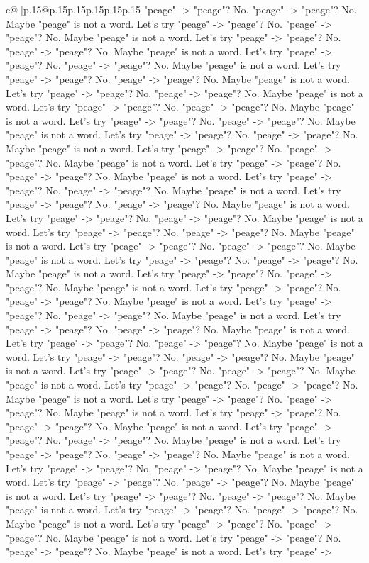 \documentclass{article}
\begin{document}
{\begin{supertabular}{c@{$\;$}|p{.15\linewidth}@{}p{.15\linewidth}p{.15\linewidth}p{.15\linewidth}p{.15\linewidth}p{.15\linewidth}}
{{{"peage" {-}> "peage"? No. "peage" {-}> "peage"? No. Maybe "peage" is not a word. Let's try "peage" {-}> "peage"? No. "peage" {-}> "peage"? No. Maybe "peage" is not a word. Let's try "peage" {-}> "peage"? No. "peage" {-}> "peage"? No. Maybe "peage" is not a word. Let's try "peage" {-}> "peage"? No. "peage" {-}> "peage"? No. Maybe "peage" is not a word. Let's try "peage" {-}> "peage"? No. "peage" {-}> "peage"? No. Maybe "peage" is not a word. Let's try "peage" {-}> "peage"? No. "peage" {-}> "peage"? No. Maybe "peage" is not a word. Let's try "peage" {-}> "peage"? No. "peage" {-}> "peage"? No. Maybe "peage" is not a word. Let's try "peage" {-}> "peage"? No. "peage" {-}> "peage"? No. Maybe "peage" is not a word. Let's try "peage" {-}> "peage"? No. "peage" {-}> "peage"? No. Maybe "peage" is not a word. Let's try "peage" {-}> "peage"? No. "peage" {-}> "peage"? No. Maybe "peage" is not a word. Let's try "peage" {-}> "peage"? No. "peage" {-}> "peage"? No. Maybe "peage" is not a word. Let's try "peage" {-}> "peage"? No. "peage" {-}> "peage"? No. Maybe "peage" is not a word. Let's try "peage" {-}> "peage"? No. "peage" {-}> "peage"? No. Maybe "peage" is not a word. Let's try "peage" {-}> "peage"? No. "peage" {-}> "peage"? No. Maybe "peage" is not a word. Let's try "peage" {-}> "peage"? No. "peage" {-}> "peage"? No. Maybe "peage" is not a word. Let's try "peage" {-}> "peage"? No. "peage" {-}> "peage"? No. Maybe "peage" is not a word. Let's try "peage" {-}> "peage"? No. "peage" {-}> "peage"? No. Maybe "peage" is not a word. Let's try "peage" {-}> "peage"? No. "peage" {-}> "peage"? No. Maybe "peage" is not a word. Let's try "peage" {-}> "peage"? No. "peage" {-}> "peage"? No. Maybe "peage" is not a word. Let's try "peage" {-}> "peage"? No. "peage" {-}> "peage"? No. Maybe "peage" is not a word. Let's try "peage" {-}> "peage"? No. "peage" {-}> "peage"? No. Maybe "peage" is not a word. Let's try "peage" {-}> "peage"? No. "peage" {-}> "peage"? No. Maybe "peage" is not a word. Let's try "peage" {-}> "peage"? No. "peage" {-}> "peage"? No. Maybe "peage" is not a word. Let's try "peage" {-}> "peage"? No. "peage" {-}> "peage"? No. Maybe "peage" is not a word. Let's try "peage" {-}> "peage"? No. "peage" {-}> "peage"? No. Maybe "peage" is not a word. Let's try "peage" {-}> "peage"? No. "peage" {-}> "peage"? No. Maybe "peage" is not a word. Let's try "peage" {-}> "peage"? No. "peage" {-}> "peage"? No. Maybe "peage" is not a word. Let's try "peage" {-}> "peage"? No. "peage" {-}> "peage"? No. Maybe "peage" is not a word. Let's try "peage" {-}> "peage"? No. "peage" {-}> "peage"? No. Maybe "peage" is not a word. Let's try "peage" {-}> "peage"? No. "peage" {-}> "peage"? No. Maybe "peage" is not a word. Let's try "peage" {-}> "peage"? No. "peage" {-}> "peage"? No. Maybe "peage" is not a word. Let's try "peage" {-}> "peage"? No. "peage" {-}> "peage"? No. Maybe "peage" is not a word. Let's try "peage" {-}> "peage"? No. "peage" {-}> "peage"? No. Maybe "peage" is not a word. Let's try "peage" {-}> "peage"? No. "peage" {-}> "peage"? No. Maybe "peage" is not a word. Let's try "peage" {-}> "peage"? No. "peage" {-}> "peage"? No. Maybe "peage" is not a word. Let's try "peage" {-}> }}}
\end{supertabular}}
\end{document}
